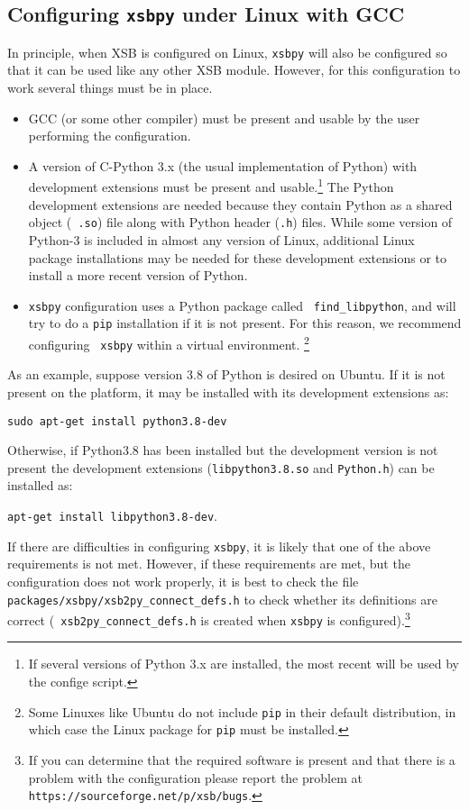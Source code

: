 \subsection{Configuring {\tt xsbpy} under Linux with GCC}

In principle, when XSB is configured on Linux, {\tt xsbpy} will also
be configured so that it can be used like any other XSB module.
However, for this configuration to work several things must be in
place.

\begin{itemize}
\item GCC (or some other compiler) must be present and usable by the
  user performing the configuration.

\item A version of C-Python 3.x (the usual implementation of Python)
  with development extensions must be present and usable.\footnote{If
    several versions of Python 3.x are installed, the most recent will
    be used by the confige script.}  The Python development extensions
  are needed because they contain Python as a shared object ({\tt
    .so}) file along with Python header ({\tt .h}) files.  While some
  version of Python-3 is included in almost any version of Linux,
  additional Linux package installations may be needed for these
  development extensions or to install a more recent version of Python.

  \item {\tt xsbpy} configuration uses a Python package called {\tt
    find\_libpython}, and will try to do a {\tt pip} installation if
    it is not present.  For this reason, we recommend configuring {\tt
      xsbpy} within a virtual environment. \footnote{Some Linuxes like
      Ubuntu do not include {\tt pip} in their default distribution, in
      which case the Linux package for {\tt pip} must be installed.}
\end{itemize}

  As an example, suppose version 3.8 of Python is desired on Ubuntu.
  If it is not present on the platform, it may be installed with its
  development extensions as:

  {\tt sudo apt-get install python3.8-dev}

Otherwise, if Python3.8 has been installed but the development version
is not present the development extensions ({\tt libpython3.8.so} and
{\tt Python.h}) can be installed as:

{\tt apt-get install libpython3.8-dev}.


If there are difficulties in configuring {\tt xsbpy}, it is likely
that one of the above requirements is not met.  However, if these
requirements are met, but the configuration does not work properly, it
is best to check the file {\tt packages/xsbpy/xsb2py\_connect\_defs.h}
to check whether its definitions are correct ({\tt
  xsb2py\_connect\_defs.h} is created when {\tt xsbpy} is
configured).\footnote{If you can determine that the required software
  is present and that there is a problem with the configuration please
  report the problem at {\tt https://sourceforge.net/p/xsb/bugs}.}

